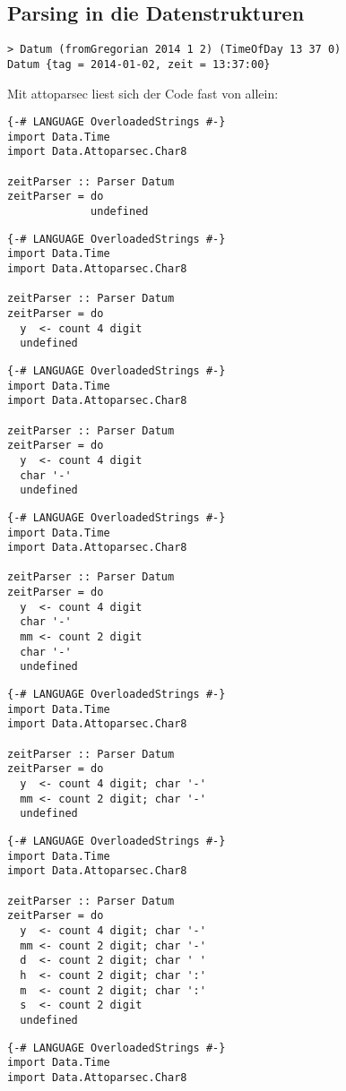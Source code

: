\documentclass{beamer}
\begin{document}
\subsection{Parsing in die Datenstrukturen}
\begin{frame}[fragile]
\begin{verbatim}
> Datum (fromGregorian 2014 1 2) (TimeOfDay 13 37 0)
Datum {tag = 2014-01-02, zeit = 13:37:00}
\end{verbatim}
\pause
Mit attoparsec liest sich der Code fast von allein:
\begin{overprint}
\begin{verbatim}
{-# LANGUAGE OverloadedStrings #-}
import Data.Time
import Data.Attoparsec.Char8

zeitParser :: Parser Datum
zeitParser = do
             undefined
\end{verbatim}
\begin{verbatim}
{-# LANGUAGE OverloadedStrings #-}
import Data.Time
import Data.Attoparsec.Char8

zeitParser :: Parser Datum
zeitParser = do
  y  <- count 4 digit
  undefined
\end{verbatim}
\begin{verbatim}
{-# LANGUAGE OverloadedStrings #-}
import Data.Time
import Data.Attoparsec.Char8

zeitParser :: Parser Datum
zeitParser = do
  y  <- count 4 digit
  char '-'
  undefined
\end{verbatim}
\begin{verbatim}
{-# LANGUAGE OverloadedStrings #-}
import Data.Time
import Data.Attoparsec.Char8

zeitParser :: Parser Datum
zeitParser = do
  y  <- count 4 digit
  char '-'
  mm <- count 2 digit
  char '-'
  undefined
\end{verbatim}
\begin{verbatim}
{-# LANGUAGE OverloadedStrings #-}
import Data.Time
import Data.Attoparsec.Char8

zeitParser :: Parser Datum
zeitParser = do
  y  <- count 4 digit; char '-'
  mm <- count 2 digit; char '-'
  undefined
\end{verbatim}
\begin{verbatim}
{-# LANGUAGE OverloadedStrings #-}
import Data.Time
import Data.Attoparsec.Char8

zeitParser :: Parser Datum
zeitParser = do
  y  <- count 4 digit; char '-'
  mm <- count 2 digit; char '-'
  d  <- count 2 digit; char ' '
  h  <- count 2 digit; char ':'
  m  <- count 2 digit; char ':'
  s  <- count 2 digit
  undefined
\end{verbatim}
\begin{verbatim}
{-# LANGUAGE OverloadedStrings #-}
import Data.Time
import Data.Attoparsec.Char8


\end{verbatim}
\end{overprint}
\end{frame}
\end{document}

